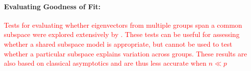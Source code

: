 \documentclass{statsoc}
\newcommand{\tr}{\text{tr}}
\newcommand{\edits}[1]{{\textsf{\textcolor{red}{#1}}}}
\begin{document}


\paragraph{Evaluating Goodness of Fit:}

\edits{Tests for evaluating whether eigenvectors from multiple groups
  span a common subspace were explored extensively by
  \citet{schott1991some}.  These tests can be useful for assessing
  whether a shared subspace model is appropriate, but cannot
  be used to test whether a particular subspace explains
  variation across groups.  These results are also based
  on classical asymptotics and are thus less accurate when
  $n \ll p$}
\end{document}
